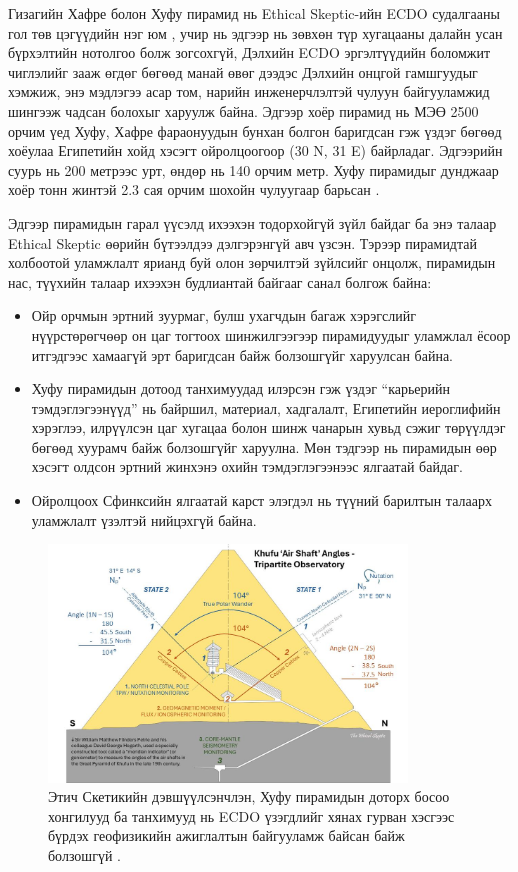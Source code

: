 \documentclass[10pt,twocolumn,letterpaper]{article}
\begin{document}
Гизагийн Хафре болон Хуфу пирамид нь Ethical Skeptic-ийн ECDO судалгааны гол төв цэгүүдийн нэг юм \cite{27}, учир нь эдгээр нь зөвхөн түр хугацааны далайн усан бүрхэлтийн нотолгоо болж зогсохгүй, Дэлхийн ECDO эргэлтүүдийн боломжит чиглэлийг зааж өгдөг бөгөөд манай өвөг дээдэс Дэлхийн онцгой гамшгуудыг хэмжиж, энэ мэдлэгээ асар том, нарийн инженерчлэлтэй чулуун байгууламжид шингээж чадсан болохыг харуулж байна. Эдгээр хоёр пирамид нь МЭӨ 2500 орчим үед Хуфу, Хафре фараонуудын бунхан болгон баригдсан гэж үздэг бөгөөд хоёулаа Египетийн хойд хэсэгт ойролцоогоор (30 N, 31 E) байрладаг. Эдгээрийн суурь нь 200 метрээс урт, өндөр нь 140 орчим метр. Хуфу пирамидыг дунджаар хоёр тонн жинтэй 2.3 сая орчим шохойн чулуугаар барьсан \cite{24, 25}.

Эдгээр пирамидын гарал үүсэлд ихээхэн тодорхойгүй зүйл байдаг ба энэ талаар Ethical Skeptic өөрийн бүтээлдээ дэлгэрэнгүй авч үзсэн. Тэрээр пирамидтай холбоотой уламжлалт ярианд буй олон зөрчилтэй зүйлсийг онцолж, пирамидын нас, түүхийн талаар ихээхэн будлиантай байгааг санал болгож байна:

\begin{flushleft}
\begin{itemize}
    \item Ойр орчмын эртний зуурмаг, булш ухагчдын багаж хэрэгслийг нүүрстөрөгчөөр он цаг тогтоох шинжилгээгээр пирамидуудыг уламжлал ёсоор итгэдгээс хамаагүй эрт баригдсан байж болзошгүйг харуулсан байна.
    \item Хуфу пирамидын дотоод танхимуудад илэрсэн гэж үздэг “карьерийн тэмдэглэгээнүүд” нь байршил, материал, хадгалалт, Египетийн иероглифийн хэрэглээ, илрүүлсэн цаг хугацаа болон шинж чанарын хувьд сэжиг төрүүлдэг бөгөөд хуурамч байж болзошгүйг харуулна. Мөн тэдгээр нь пирамидын өөр хэсэгт олдсон эртний жинхэнэ охийн тэмдэглэгээнээс ялгаатай байдаг.
    \item Ойролцоох Сфинксийн ялгаатай карст элэгдэл нь түүний барилтын талаарх уламжлалт үзэлтэй нийцэхгүй байна.
\end{itemize}
\end{flushleft}
\begin{figure}[b]
\begin{center}
\includegraphics[width=0.85\textwidth]{shafts.jpg}
\end{center}
   \caption{Этич Скетикийн дэвшүүлсэнчлэн, Хуфу пирамидын доторх босоо хонгилууд ба танхимууд нь ECDO үзэгдлийг хянах гурван хэсгээс бүрдэх геофизикийн ажиглалтын байгууламж байсан байж болзошгүй \cite{28}.}
\label{fig:5}
\end{figure}
\end{document}
